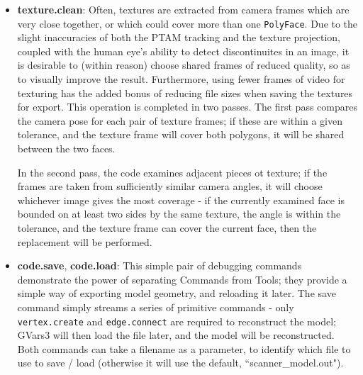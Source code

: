 \documentclass[a4paper,10pt]{article}
\begin{document}
\begin{itemize}
\item{\textbf{texture.clean}: Often, textures are extracted from camera frames which are very close together, or which could cover more than one \texttt{PolyFace}. Due to the slight inaccuracies of both the PTAM tracking and the texture projection, coupled with the human eye's ability to detect discontinuites in an image, it is desirable to (within reason) choose shared frames of reduced quality, so as to visually improve the result. Furthermore, using fewer frames of video for texturing has the added bonus of reducing file sizes when saving the textures for export. This operation is completed in two passes. The first pass compares the camera pose for each pair of texture frames; if these are within a given tolerance, and the texture frame will cover both polygons, it will be shared between the two faces.

In the second pass, the code examines adjacent pieces ot texture; if the frames are taken from sufficiently similar camera angles, it will choose whichever  image gives the most coverage - if the currently examined face is bounded on at least two sides by the same texture, the angle is within the tolerance, and the texture frame can cover the current face, then the replacement will be performed.}
\item{\textbf{code.save}, \textbf{code.load}: This simple pair of debugging commands demonstrate the power of separating Commands from Tools; they provide a simple way of exporting model geometry, and reloading it later. The save command simply streams a series of primitive commands - only \texttt{vertex.create} and \texttt{edge.connect} are required to reconstruct the model; GVars3 will then load the file later, and the model will be reconstructed. Both commands can take a filename as a parameter, to identify which file to use to save / load (otherwise it will use the default, ``scanner\_model.out").}


\end{itemize}
\end{document}
